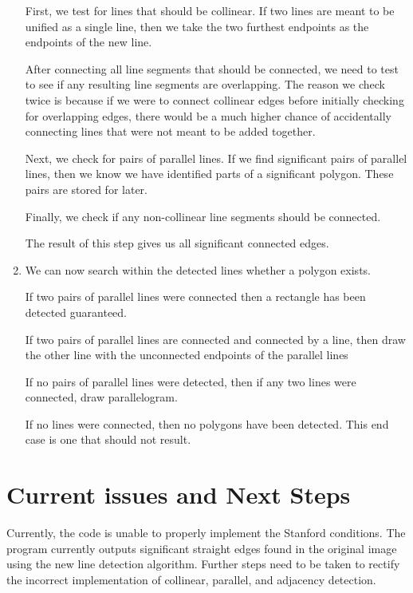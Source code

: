\documentclass[12pt]{article}
\begin{document}
\begin{enumerate}
	First, we test for lines that should be collinear. If two lines are meant to be unified as a single line, then we take the two furthest endpoints as the endpoints of the new line. 
	
	After connecting all line segments that should be connected, we need to test to see if any resulting line segments are overlapping. The reason we check twice is because if we were to connect collinear edges before initially checking for overlapping edges, there would be a much higher chance of accidentally connecting lines that were not meant to be added together.
	
	Next, we check for pairs of parallel lines. If we find significant pairs of parallel lines, then we know we have identified parts of a significant polygon. These pairs are stored for later. 
	
	Finally, we check if any non-collinear line segments should be connected.
	
	The result of this step gives us all significant connected edges. 

\item We can now search within the detected lines whether a polygon exists.
	
	If two pairs of parallel lines were connected then a rectangle has been detected guaranteed.
    
    	If two pairs of parallel lines are connected and connected by a line, then draw the other line with the unconnected endpoints of the parallel lines
    	
	If no pairs of parallel lines were detected, then if any two lines were connected, draw parallelogram.
	
        If no lines were connected, then no polygons have been detected. This end case is one that should not result.

	

\end{enumerate}

\section {Current issues and Next Steps}

Currently, the code is unable to properly implement the Stanford conditions. The program currently outputs significant straight edges found in the original image using the new line detection algorithm. Further steps need to be taken to rectify the incorrect implementation of collinear, parallel, and adjacency detection.
	
\end{document}
